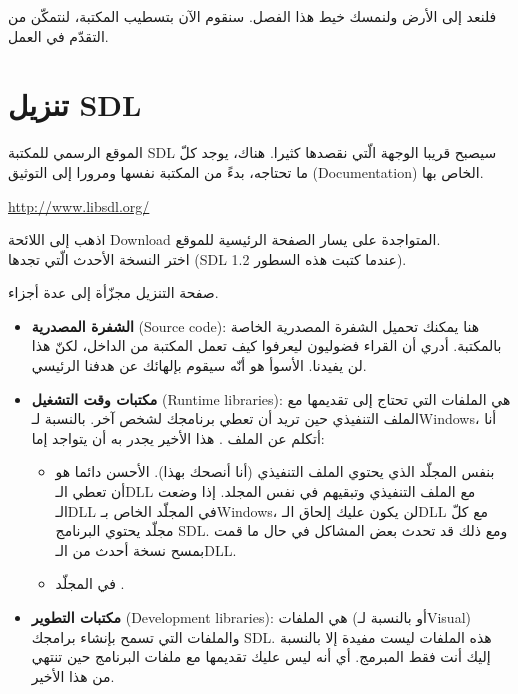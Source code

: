 فلنعد إلى الأرض ولنمسك خيط هذا الفصل. سنقوم الآن بتسطيب المكتبة، لنتمكّن من التقدّم في العمل.

\section{تنزيل \textenglish{SDL}}

الموقع الرسمي للمكتبة 
\textenglish{SDL}
سيصبح قريبا الوجهة الّتي نقصدها كثيرا. هناك، يوجد كلّ ما تحتاجه، بدءً من المكتبة نفسها ومرورا إلى التوثيق 
(\textenglish{Documentation})
الخاص بها.

\url{http://www.libsdl.org/}

اذهب إلى اللائحة
\textenglish{Download}
المتواجدة على يسار الصفحة الرئيسية للموقع.\\
اختر النسخة الأحدث الّتي تجدها
(\textenglish{SDL 1.2}
عندما كتبت هذه السطور).

صفحة التنزيل مجزّأة إلى عدة أجزاء. 

\begin{itemize}
	\item \textbf{الشفرة المصدرية}
	(\textenglish{Source code}):
هنا يمكنك تحميل الشفرة المصدرية الخاصة بالمكتبة. أدري أن القراء فضوليون ليعرفوا كيف تعمل المكتبة من الداخل، لكنّ هذا لن يفيدنا. الأسوأ هو أنّه سيقوم بإلهائك عن هدفنا الرئيسي.
	\item \textbf{مكتبات وقت التشغيل}
	(\textenglish{Runtime libraries}):
	هي الملفات التي تحتاج إلى تقديمها مع الملف التنفيذي حين تريد أن تعطي برنامجك لشخص آخر. بالنسبة لـ\textenglish{Windows}، أنا أتكلم عن الملف 
	.
	هذا الأخير يجدر به أن يتواجد إما:
	
	\begin{itemize}
		\item بنفس المجلّد الذي يحتوي الملف التنفيذي
		(أنا أنصحك بهذا). الأحسن دائما هو أن تعطي الـ\textenglish{DLL}
		مع الملف التنفيذي وتبقيهم في نفس المجلد. إذا وضعت الـ\textenglish{DLL}
		في المجلّد الخاص بـ\textenglish{Windows}، لن يكون عليك إلحاق الـ\textenglish{DLL}
		مع كلّ مجلّد يحتوي البرنامج
		\textenglish{SDL}.
		ومع ذلك قد تحدث بعض المشاكل في حال ما قمت بمسح نسخة أحدث من الـ\textenglish{DLL}.
		\item في المجلّد
		.
	\end{itemize}
	
	\item \textbf{مكتبات التطوير}
	(\textenglish{Development libraries}):
	هي الملفات
	(أو
	بالنسبة لـ\textenglish{Visual})
	والملفات 
	التي تسمح بإنشاء برامجك
	\textenglish{SDL}.
	هذه الملفات ليست مفيدة إلا بالنسبة إليك أنت فقط المبرمج. أي أنه ليس عليك تقديمها مع ملفات البرنامج حين تنتهي من هذا الأخير.
\end{itemize}

